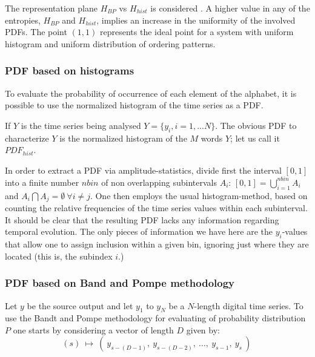 The representation plane $H_{BP}$ vs $H_{hist}$ is considered \cite{DeMicco2008}.
A higher value in any of the entropies, $H_{BP}$ and $H_{hist}$, implies an
increase in the uniformity of the involved PDFs. The point
$(1,1)$ represents the ideal point for a system with uniform histogram and
uniform distribution of ordering patterns.
\subsubsection{PDF based on histograms}

To evaluate the probability of occurrence of each element of the alphabet, it is possible to use the normalized histogram of the time series as a PDF.

If $Y$ is the time series being analysed $Y=\{y_i,i=1,...N\}$. The obvious PDF to characterize $Y$ is the normalized histogram of the $M$ words $Y$; let us call it  $PDF_{hist}$.
 
In order to  extract a PDF via amplitude-statistics, divide first
the interval $[0,1]$ into a finite number $nbin$ of non
overlapping subintervals $A_i$: $[0,1]=\bigcup_{i=1}^{nbin} A_i$
and $A_i\bigcap A_j=\emptyset~\forall i\neq j$. One then employs
the usual histogram-method, based on counting the relative
frequencies of the time series values within each subinterval. It
should be clear that the resulting  PDF lacks any information
regarding temporal evolution. The only pieces of information we
have here are the $y_i$-values that allow one to assign inclusion
within a given bin, ignoring just where they are located (this is,
the subindex $i$.)

\subsubsection{PDF based on Band and Pompe methodology}
%
Let $y$ be the source output and let $y_1$ to $y_N$ be a $N$-length digital time series.
To use the Bandt and Pompe \cite{Pompe2002} methodology for evaluating
of probability distribution $P$ one starts by  considering
a vector of length $D$ given by: 
\begin{equation}
(s)~\mapsto~
\left(~y_{s-(D-1)},~y_{s-(D-2)},~\dots,~y_{s-1},~y_{s}~\right) \,
 \label{eq:vectores}
\end{equation}

